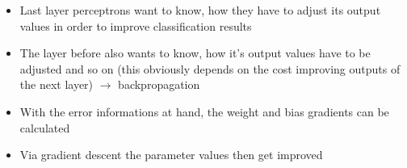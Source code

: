 \begin{itemize}
\begin{itemize}
            \item
                Last layer perceptrons want to know, how they have to adjust its output values in order to improve classification results
            \item
                The layer before also wants to know, how it's output values have to be adjusted and so on (this obviously depends on the cost improving outputs of the next layer) $\rightarrow$ backpropagation
            \item
                With the error informations at hand, the weight and bias gradients can be calculated
            \item
                Via gradient descent the parameter values then get improved
        \end{itemize}
\end{itemize}
